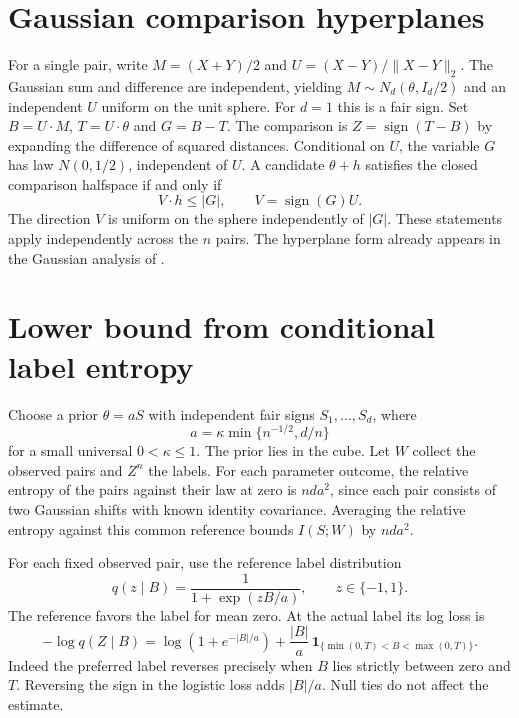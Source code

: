 \documentclass[11pt,a4paper]{amsart}
\begin{document}
\section{Gaussian comparison hyperplanes}

For a single pair, write \(M=(X+Y)/2\) and \(U=(X-Y)/\|X-Y\|_2\). The Gaussian sum and difference are independent, yielding \(M\sim N_d(\theta,I_d/2)\) and an independent \(U\) uniform on the unit sphere. For \(d=1\) this is a fair sign. Set \(B=U\cdot M\), \(T=U\cdot\theta\) and \(G=B-T\). The comparison is \(Z=\operatorname{sign}(T-B)\) by expanding the difference of squared distances. Conditional on \(U\), the variable \(G\) has law \(N(0,1/2)\), independent of \(U\). A candidate \(\theta+h\) satisfies the closed comparison halfspace if and only if
\begin{equation}\label{eq:half}
 V\cdot h\le |G|,\qquad V=\operatorname{sign}(G)U.
\end{equation}
The direction \(V\) is uniform on the sphere independently of \(|G|\). These statements apply independently across the \(n\) pairs. The hyperplane form already appears in the Gaussian analysis of \cite{jyf}.

\section{Lower bound from conditional label entropy}

Choose a prior \(\theta=aS\) with independent fair signs \(S_1,\ldots,S_d\), where
\[
 a=\kappa\min\{n^{-1/2},d/n\}
\]
for a small universal \(0<\kappa\le1\). The prior lies in the cube. Let \(W\) collect the observed pairs and \(Z^n\) the labels. For each parameter outcome, the relative entropy of the pairs against their law at zero is \(nda^2\), since each pair consists of two Gaussian shifts with known identity covariance. Averaging the relative entropy against this common reference bounds \(I(S;W)\) by \(nda^2\).

For each fixed observed pair, use the reference label distribution
\[
 q(z\mid B)=\frac{1}{1+\exp(zB/a)},\qquad z\in\{-1,1\}.
\]
The reference favors the label for mean zero. At the actual label its log loss is
\begin{equation}\label{eq:loss}
 -\log q(Z\mid B)=\log(1+e^{-|B|/a})
     +\frac{|B|}{a}\,\mathbf{1}_{\{\min(0,T)<B<\max(0,T)\}} .
\end{equation}
Indeed the preferred label reverses precisely when \(B\) lies strictly between zero and \(T\). Reversing the sign in the logistic loss adds \(|B|/a\). Null ties do not affect the estimate.
\end{document}
